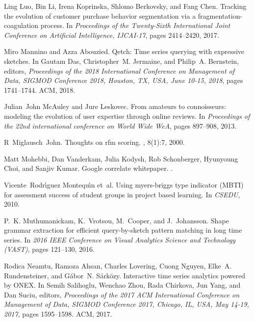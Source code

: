 \documentclass[11pt]{article}
\begin{document}
\begin{thebibliography}{10}
\begin{small}
Ling Luo, Bin Li, Irena Koprinska, Shlomo Berkovsky, and Fang Chen.
\newblock Tracking the evolution of customer purchase behavior segmentation via
  a fragmentation-coagulation process.
\newblock In {\em Proceedings of the Twenty-Sixth International Joint
  Conference on Artificial Intelligence, {IJCAI-17}}, pages 2414--2420, 2017.

Miro Mannino and Azza Abouzied.
\newblock Qetch: Time series querying with expressive sketches.
\newblock In Gautam Das, Christopher~M. Jermaine, and Philip~A. Bernstein,
  editors, {\em Proceedings of the 2018 International Conference on Management
  of Data, {SIGMOD} Conference 2018, Houston, TX, USA, June 10-15, 2018}, pages
  1741--1744. {ACM}, 2018.

Julian~John McAuley and Jure Leskovec.
\newblock From amateurs to connoisseurs: modeling the evolution of user
  expertise through online reviews.
\newblock In {\em Proceedings of the 22nd international conference on World
  Wide WeA}, pages 897--908, 2013.

R~Miglausch~John.
\newblock Thoughts on rfm scoring.
, 8(1):7, 2000.

Matt Mohebbi, Dan Vanderkam, Julia Kodysh, Rob Schonberger, Hyunyoung Choi, and
  Sanjiv Kumar.
\newblock Google correlate whitepaper.
.

Vicente~Rodr{\'{\i}}guez Montequ{\'{\i}}n et~al.
\newblock Using myers-briggs type indicator {(MBTI)} for assessment success of
  student groups in project based learning.
\newblock In {\em {CSEDU}}, 2010.

P.~K. {Muthumanickam}, K.~{Vrotsou}, M.~{Cooper}, and J.~{Johansson}.
\newblock Shape grammar extraction for efficient query-by-sketch pattern
  matching in long time series.
\newblock In {\em 2016 IEEE Conference on Visual Analytics Science and
  Technology (VAST)}, pages 121--130, 2016.

Rodica Neamtu, Ramoza Ahsan, Charles Lovering, Cuong Nguyen, Elke~A.
  Rundensteiner, and G{\'{a}}bor~N. S{\'{a}}rk{\"{o}}zy.
\newblock Interactive time series analytics powered by {ONEX}.
\newblock In Semih Salihoglu, Wenchao Zhou, Rada Chirkova, Jun Yang, and Dan
  Suciu, editors, {\em Proceedings of the 2017 {ACM} International Conference
  on Management of Data, {SIGMOD} Conference 2017, Chicago, IL, USA, May 14-19,
  2017}, pages 1595--1598. {ACM}, 2017.


\end{small}
\end{thebibliography}
\end{document}
